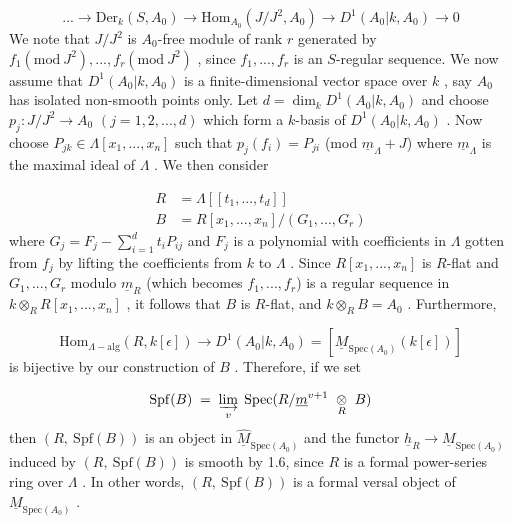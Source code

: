 \begin{equation*}
... \to \mathrm{Der}_k(S, A_0) \to \mathrm{Hom}_{A_0}(J/J^2, A_0) \to D^1(A_0|k, A_0) \to 0
\end{equation*}
We note that  $J/J^2$  is  $A_0$-free module of rank  $r$  generated by $f_1(\mathrm{mod}\ J^2),...,f_r(\mathrm{mod}\ J^2)$  , since  $f_1,...,f_r$  is an $S$-regular sequence. We now assume that  $D^1(A_0|k, A_0)$  is a finite-dimensional vector space over  $k$  , say  $A_0$ has isolated non-smooth points only. Let  $d = \dim_k D^1(A_0|k, A_0)$  and choose $p_j : J/J^2 \to A_0$   $(j = 1, 2,...,d)$  which form a $k$-basis of  $D^1(A_0|k, A_0)$  . Now choose  $P_{jk} \in \Lambda[x_1,...,x_n]$  such that  $p_j(f_i) = P_{ji}$  (mod $\underline{m}_\Lambda + J$)  where  $\underline{m}_\Lambda$  is the maximal ideal of  $\Lambda$  . We then consider

\begin{equation*}
\begin{aligned}
R &= \Lambda[[t_1,...,t_d]] \\
B &= R[x_1,...,x_n]/(G_1,...,G_r)
\end{aligned}
\end{equation*}
where  $G_j = F_j - \sum_{i=1}^{d} t_i P_{ij}$  and  $F_j$  is a polynomial with coefficients in  $\Lambda$ gotten from  $f_j$  by lifting the coefficients from  $k$  to  $\Lambda$  . Since $R[x_1,...,x_n]$  is $R$-flat and  $G_1,...,G_r$  modulo  $\underline{m}_R$  (which becomes  $f_1,...,f_r$) is a regular sequence in  $k \otimes_R R[x_1,...,x_n]$  , it follows that  $B$  is $R$-flat, and $k \otimes_R B = A_0$  . Furthermore,

\begin{equation*}
\mathrm{Hom}_{\Lambda-\mathrm{alg}}(R, k[\epsilon]) \to D^1(A_0|k, A_0) = [\underline{M}_{\mathrm{Spec}(A_0)}(k[\epsilon])]
\end{equation*}
is bijective by our construction of  $B$  . Therefore, if we set 



\begin{equation*}
 \mathrm{Spf}(B) \;=\; \varinjlim_{v}\; \mathrm{Spec}(R/\underline{m}^{v+1}\ \underset{R}{\otimes}\ B)
\end{equation*}
then  $(R,\ \mathrm{Spf}(B))$  is an object in  $\widehat{\underline{M}}_{\mathrm{Spec}(A_0)}$  and the functor  $\underline{h}_R \to \underline{M}_{\mathrm{Spec}(A_0)}$  induced by  $(R,\ \mathrm{Spf}(B))$  is smooth by 1.6, since  $R$  is a formal power-series ring over  $\Lambda$  . In other words,  $(R,\ \mathrm{Spf}(B))$  is a formal versal object of  $\underline{M}_{\mathrm{Spec}(A_0)}$  .

